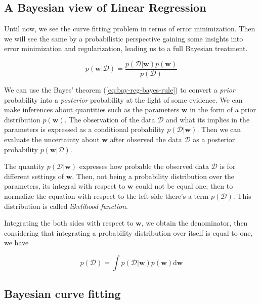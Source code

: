 \documentclass[11pt]{article} %
\begin{document}
\subsection{A Bayesian view of Linear Regression}

Until now, we see the curve fitting problem in terms of error minimization. Then we will see the same by a probabilistic perspective gaining some insights into error minimization and regularization, leading us to a full Bayesian treatment.

\begin{equation}
   \label{eq:bay-reg-bayes-rule}
   p(\mathbf{w} | \mathcal{D})=\frac{p(\mathcal{D} | \mathbf{w}) p(\mathbf{w})}{p(\mathcal{D})}
\end{equation}

We can use the Bayes' theorem (\ref{eq:bay-reg-bayes-rule}) to convert a \textit{prior} probability into a \textit{posterior} probability at the light of some evidence. We can make inferences about quantities such as  the parameters $\mathbf{w}$ in the form of a prior distribution $p(\mathbf{w})$. The observation of the data $\mathcal{D}$ and what its implies in the parameters is expressed as a conditional probability $p(\mathcal{D}|\mathbf{w})$. Then we can evaluate the uncertainty about $\mathbf{w}$ after observed the data $\mathcal{D}$ as a posterior probability $p(\mathbf{w}|\mathcal{D})$.

The quantity $p(\mathcal{D}|\mathbf{w})$ expresses how probable the observed data $\mathcal{D}$ is for different settings of $\mathbf{w}$. Then, not being a probability distribution over the parameters, its integral with respect to $\mathbf{w}$ could not be equal one, then to normalize the equation with respect to the left-side there's a term $p(\mathcal{D})$. This distribution is called \textit{likelihood function}.

Integrating the both sides with respect to $\mathbf{w}$, we obtain the denominator, then considering that integrating a probability distribution over itself is equal to one, we have

\begin{equation}
   \label{eq:bay-lin-bayes-theorem}
   p(\mathcal{D})=\int p(\mathcal{D} | \mathbf{w}) p(\mathbf{w}) \mathrm{d} \mathbf{w}
\end{equation}

\subsection{Bayesian curve fitting}
\end{document}
